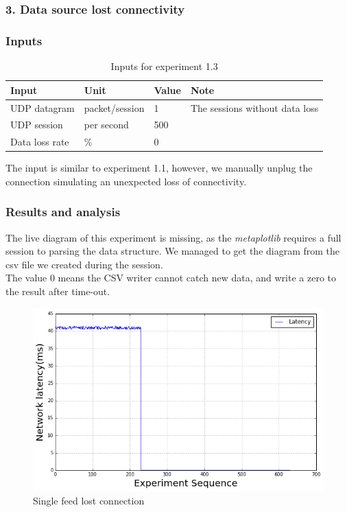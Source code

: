 \documentclass[11pt,openright,a4paper]{report}
\begin{document}
\subsubsection{3. Data source lost connectivity}
\subsubsection{Inputs}
\begin{table}[H]
	\centering
	\caption{Inputs for experiment 1.3}
	\label{my-label}
	\begin{tabular}{@{}llll@{}}
		\toprule
		Input          & Unit & Value           & Note                           \\ \midrule
		UDP datagram   & packet/session & 1     & The sessions without data loss \\
		UDP session & per second   & 500         &                                \\
		Data loss rate & \%   & 0         &                                \\
		\bottomrule
	\end{tabular}
\end{table}
The input is similar to experiment 1.1, however, we manually unplug the connection simulating an unexpected loss of connectivity.\\
\subsubsection{Results and analysis}
The live diagram of this experiment is missing, as the \textit{metaplotlib} requires a full session to parsing the data structure. We managed to get the diagram from the csv file we created during the session.\\
The value 0 means the CSV writer cannot catch new data, and write a zero to the result after time-out.
\begin{figure}[H]
\centering
\includegraphics[width=0.7\linewidth]{picture/experiments/exp1/lostConnect}
\caption{Single feed lost connection}
\label{fig:lostConnect}
\end{figure}
\end{document}
